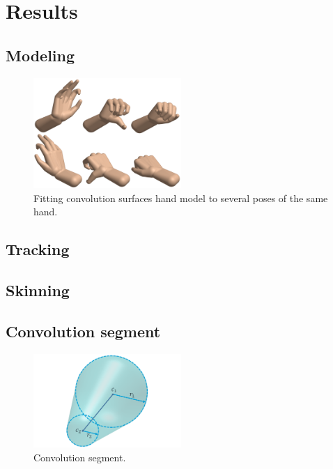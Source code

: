 \documentclass[10pt,journal,a4paper]{IEEEtran}
\begin{document}

\section{Results}

\subsection{Modeling}

\begin{figure}[h!] 
	\centering
	\includegraphics[width=0.5\textwidth]{figures/modeling}
	\caption{Fitting convolution surfaces hand model to several poses of the same hand.}
	\label{fig:modeling}
\end{figure}

\subsection{Tracking}

\subsection{Skinning}


\appendix
\subsection{Convolution segment}

\begin{figure}[h!] 
	\centering
	\includegraphics[width=0.5\textwidth]{figures/convsegment.png}
	\caption{Convolution segment.}
	\label{fig:convsegment}
\end{figure}
\end{document}
